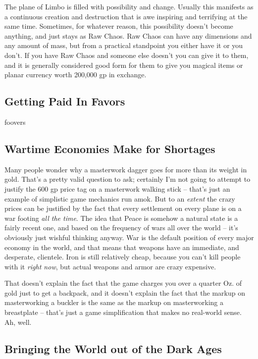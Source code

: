 The plane of Limbo is filled with possibility and change. Usually this manifests as a continuous creation and destruction that is awe inspiring and terrifying at the same time. Sometimes, for whatever reason, this possibility doesn't become anything, and just stays as Raw Chaos. Raw Chaos can have any dimensions and any amount of mass, but from a practical standpoint you either have it or you don't. If you have Raw Chaos and someone else doesn't you can give it to them, and it is generally considered good form for them to give you magical items or planar currency worth 200,000 gp in exchange.

\subsection{Getting Paid In Favors}

foovers

\subsection{Wartime Economies Make for Shortages}

Many people wonder why a masterwork dagger goes for more than its weight in gold. That's a pretty valid question to ask; certainly I'm not going to attempt to justify the 600 gp price tag on a masterwork walking stick -- that's just an example of simplistic game mechanics run amok. But to an \textit{extent} the crazy prices can be justified by the fact that every settlement on every plane is on a war footing \textit{all the time}. The idea that Peace is somehow a natural state is a fairly recent one, and based on the frequency of wars all over the world -- it's obviously just wishful thinking anyway. War is the default position of every major economy in the world, and that means that weapons have an immediate, and desperate, clientele. Iron is still relatively cheap, because you can't kill people with it \textit{right now}, but actual weapons and armor are crazy expensive.

That doesn't explain the fact that the game charges you over a quarter Oz. of gold just to get a backpack, and it doesn't explain the fact that the markup on masterworking a buckler is the same as the markup on masterworking a breastplate -- that's just a game simplification that makes no real-world sense. Ah, well.

\subsection{Bringing the World out of the Dark Ages}

